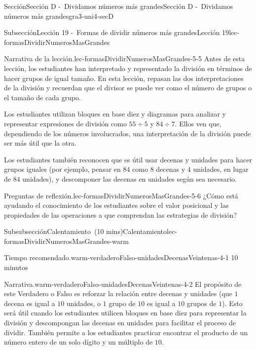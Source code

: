 \documentclass[oneside,10pt,]{article}
\begin{document}
\begin{sectionptx}{Sección}{Sección D -~Dividamos números más grandes}{}{Sección D -~Dividamos números más grandes}{}{}{gra3-uni4-secD}
\begin{subsectionptx}{Subsección}{Lección 19 -~Formas de dividir números más grandes}{}{Lección 19}{}{}{lec-formasDividirNumerosMasGrandes}
\begin{introduction}{}
\begin{paragraphs}{Narrativa de la lección.}{lec-formasDividirNumerosMasGrandes-5-5}%
Antes de esta lección, los estudiantes han interpretado y representado la división en términos de hacer grupos de igual tamaño. En esta lección, repasan las dos interpretaciones de la división y recuerdan que el divisor se puede ver como el número de grupos o el tamaño de cada grupo.%
\par
Los estudiantes utilizan bloques en base diez y diagramas para analizar y representar expresiones de división como \(55 \div 5\) y \(84 \div 7\). Ellos ven que, dependiendo de los números involucrados, una interpretación de la división puede ser más útil que la otra.%
\par
Los estudiantes también reconocen que es útil usar decenas y unidades para hacer grupos iguales (por ejemplo, pensar en \(84\) como \(8\) decenas y \(4\) unidades, en lugar de \(84\) unidades), y descomponer las decenas en unidades según sea necesario.%
\end{paragraphs}%
\begin{paragraphs}{Preguntas de reflexión.}{lec-formasDividirNumerosMasGrandes-5-6}%
¿Cómo está ayudando el conocimiento de los estudiantes sobre el valor posicional y las propiedades de las operaciones a que comprendan las estrategias de división?%
\end{paragraphs}%
\end{introduction}%
%
%
\typeout{************************************************}
\typeout{************************************************}
%
\begin{subsubsectionptx}{Subsubsección}{Calentamiento~(10 mins)}{}{Calentamiento}{}{}{lec-formasDividirNumerosMasGrandes-warm}
\par
\begin{paragraphs}{Tiempo recomendado.}{warm-verdaderoFalso-unidadesDecenasVeintenas-4-1}%
10 minutos%
\end{paragraphs}%
\begin{paragraphs}{Narrativa.}{warm-verdaderoFalso-unidadesDecenasVeintenas-4-2}%
El propósito de este Verdadero o Falso es reforzar la relación entre decenas y unidades (que \(1\) decena es igual a \(10\) unidades, o \(1\) grupo de \(10\) es igual a \(10\) grupos de \(1\)). Esto será útil cuando los estudiantes utilicen bloques en base diez para representar la división y descompongan las decenas en unidades para facilitar el proceso de dividir. También permite a los estudiantes practicar encontrar el producto de un número entero de un solo dígito y un múltiplo de \(10\).%

\end{paragraphs}
\end{subsubsectionptx}
\end{subsectionptx}
\end{sectionptx}
\end{document}
